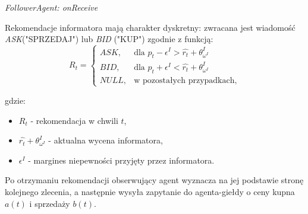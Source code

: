 \begin{pseudokod}
\caption{\textit{FollowerAgent: onReceive}}\label{alg:follower}

\vspace{0.5cm}
\vspace{0.5cm}

\end{pseudokod}
Rekomendacje informatora mają charakter dyskretny: zwracana jest wiadomość \textit{ASK}("SPRZEDAJ") lub \textit{BID} ("KUP") zgodnie z funkcją: 
$$
 R_t = 
 \left\{\begin{array}{lr}
        ASK, & \text{dla }p_t - \epsilon^I > \hat{r_t} +\theta^I_{\omega^I}\\
        BID, & \text{dla } p_t + \epsilon^I < \hat{r_t} +\theta^I_{\omega^I}\\
        NULL, & \text{w pozostałych przypadkach,}
        \end{array}

$$ 

gdzie:
\begin{itemize}
\item $R_t$ - rekomendacja w chwili $t$, 
\item $\hat{r_t} +\theta^I_{\omega^I}$ - aktualna wycena informatora, 
\item $\epsilon^I$ - margines niepewności przyjęty przez informatora.
\end{itemize}
Po otrzymaniu rekomendacji obserwujący agent wyznacza na jej podstawie stronę kolejnego zlecenia, a następnie wysyła zapytanie do agenta-giełdy o ceny kupna $a(t)$ i sprzedaży $b(t)$.
